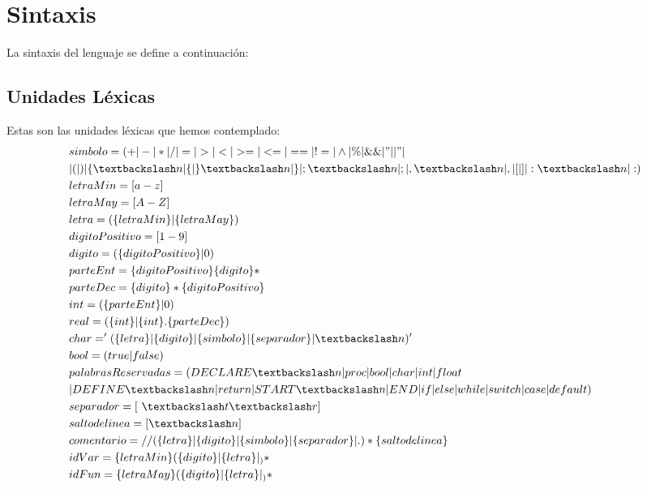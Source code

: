 \documentclass[a4paper, 12pt]{article}
\begin{document}
\section{Sintaxis}
La sintaxis del lenguaje se define a continuación:

\subsection{Unidades Léxicas}
Estas son las unidades léxicas que hemos contemplado:
\begin{align*}
&simbolo = (+|-|*|/|=|>|<|>=|<=|==|!=|\wedge|\%|\&\&|"||"|~\\
&|(|)|\{\textbackslash  n|\{|\}\textbackslash  n|\}|;\textbackslash  n|;|,\textbackslash  n|,|[|]|:\textbackslash  n|:)\\
&letraMin = [a-z]\\
&letraMay = [A-Z]\\
&letra  = (\{letraMin\}|\{letraMay\})\\
&digitoPositivo = [1-9]\\
&digito = (\{digitoPositivo\}|0)\\
&parteEnt = \{digitoPositivo\}\{digito\}*\\
&parteDec = \{digito\}*\{digitoPositivo\}\\
&int = (\{parteEnt\}|0)\\
&real = (\{int\}|\{int\}.\{parteDec\})\\
&char = '(\{letra\}|\{digito\}|\{simbolo\}|\{separador\}|\textbackslash  n)'\\
&bool = (true|false)\\
&palabrasReservadas = (DECLARE\textbackslash  n|proc|bool|char|int|float\\
&|DEFINE\textbackslash  n|return|START\textbackslash  n|END|if|else|while|switch|case|default)\\
&separador = [\ \textbackslash  t\textbackslash  r]\\
&saltodelinea = [\textbackslash  n]\\
&comentario = //(\{letra\}|\{digito\}|\{simbolo\}|\{separador\}|.)*\{saltodelinea\}\\
&idVar = \{letraMin\}(\{digito\}|\{letra\}|_)*\\
&idFun = \{letraMay\}(\{digito\}|\{letra\}|_)*\\
\end{align*}
\end{document}
